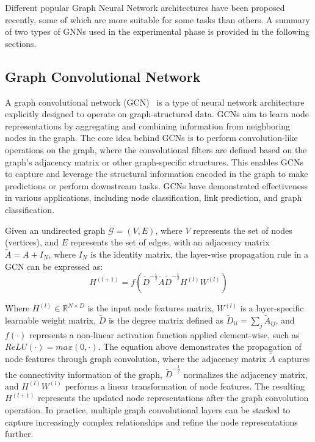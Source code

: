 Different popular Graph Neural Network architectures have been proposed recently, some of which are more suitable for some tasks than others.
A summary of two types of GNNs used in the experimental phase is provided in the following sections.

\subsection{Graph Convolutional Network}
\label{subsec:graph_convolutional_network}%

A graph convolutional network (GCN)~\cite{DBLP:journals/corr/KipfW16, daigavane2021understanding} is a type of neural network architecture explicitly designed to operate on graph-structured data.
GCNs aim to learn node representations by aggregating and combining information from neighboring nodes in the graph.
The core idea behind GCNs is to perform convolution-like operations on the graph, where the convolutional filters are defined based on the graph's adjacency matrix or other graph-specific structures.
This enables GCNs to capture and leverage the structural information encoded in the graph to make predictions or perform downstream tasks.
GCNs have demonstrated effectiveness in various applications, including node classification, link prediction, and graph classification.

Given an undirected graph $\mathcal{G} = (V, E)$, where $V$ represents the set of nodes (vertices), and $E$ represents the set of edges, with an adjacency matrix $\tilde{A}=A+I_N$, where $I_N$ is the identity matrix, the layer-wise propagation rule in a GCN can be expressed as:
\begin{equation}
    \label{eq:gcn_convolution}
    H^{(l+1)} = f \left( \tilde{D}^{-\tfrac{1}{2}}  \tilde{A}  \tilde{D}^{-\tfrac{1}{2}}  H^{(l)}  W^{(l)} \right)
\end{equation}

Where $H^{(l)} \in \mathbb{R}^{N \times D}$ is the input node features matrix, $W^{(l)}$ is a layer-specific learnable weight matrix, $\tilde{D}$ is the degree matrix defined as $\tilde{D}_{ii} = \sum_{j} \tilde{A}_{ij}$, and $f(\cdot)$ represents a non-linear activation function applied element-wise, such as $ReLU(\cdot) = max(0, \cdot)$.
The equation above demonstrates the propagation of node features through graph convolution, where the adjacency matrix $\tilde{A}$ captures the connectivity information of the graph, $\tilde{D}^{-\tfrac{1}{2}}$ normalizes the adjacency matrix, and $H^{(l)}  W^{(l)}$ performs a linear transformation of node features.
The resulting $H^{(l+1)}$ represents the updated node representations after the graph convolution operation.
In practice, multiple graph convolutional layers can be stacked to capture increasingly complex relationships and refine the node representations further.

